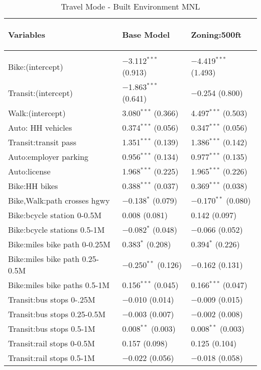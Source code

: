 \begin{longtabu}{lll}
	\caption{Travel Mode - Built Environment MNL} \\
	\label{model1} 
	
								Variables															   & Base Model						& Zoning:500ft  \\ \hline	
																							  																																												&								&								\\		   
\endhead

 Bike:(intercept) & $-$3.112$^{***}$ (0.913) & $-$4.419$^{***}$ (1.493) \\ 
 Transit:(intercept) & $-$1.863$^{***}$ (0.641) & $-$0.254 (0.800) \\ 
 Walk:(intercept) & 3.080$^{***}$ (0.366) & 4.497$^{***}$ (0.503) \\ 
 Auto: HH vehicles & 0.374$^{***}$ (0.056) & 0.347$^{***}$ (0.056) \\ 
 Transit:transit pass & 1.351$^{***}$ (0.139) & 1.386$^{***}$ (0.142) \\ 
 Auto:employer parking & 0.956$^{***}$ (0.134) & 0.977$^{***}$ (0.135) \\ 
 Auto:license & 1.968$^{***}$ (0.225) & 1.965$^{***}$ (0.226) \\ 
 Bike:HH bikes & 0.388$^{***}$ (0.037) & 0.369$^{***}$ (0.038) \\ 
 Bike,Walk:path crosses hgwy & $-$0.138$^{*}$ (0.079) & $-$0.170$^{**}$ (0.080) \\ 
 Bike:bcycle station 0-0.5M & 0.008 (0.081) & 0.142 (0.097) \\ 
 Bike:bcycle stations 0.5-1M & $-$0.082$^{*}$ (0.048) & $-$0.066 (0.052) \\ 
 Bike:miles bike path 0-0.25M & 0.383$^{*}$ (0.208) & 0.394$^{*}$ (0.226) \\ 
 Bike:miles bike path 0.25-0.5M & $-$0.250$^{**}$ (0.126) & $-$0.162 (0.131) \\ 
 Bike:miles bike paths 0.5-1M & 0.156$^{***}$ (0.045) & 0.166$^{***}$ (0.047) \\ 
 Transit:bus stops 0-.25M & $-$0.010 (0.014) & $-$0.009 (0.015) \\ 
 Transit:bus stops 0.25-0.5M & $-$0.003 (0.007) & $-$0.002 (0.008) \\ 
 Transit:bus stops 0.5-1M & 0.008$^{**}$ (0.003) & 0.008$^{**}$ (0.003) \\ 
 Transit:rail stops 0-0.5M & 0.157 (0.098) & 0.125 (0.104) \\ 
 Transit:rail stops 0.5-1M & $-$0.022 (0.056) & $-$0.018 (0.058) \\ 

\end{longtabu}
